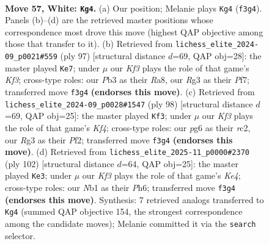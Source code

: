 \documentclass[11pt]{article}
\begin{document}
\clearpage

\begin{figure}[p]\centering
\begin{subfigure}{0.46\textwidth}\centering
\resizebox{\linewidth}{!}{%
\newchessgame
\chessboard[
  setfen={7k/5p1p/1n4p1/p3p1P1/P3P2P/1P3KR1/6P1/RN2rr2 w - - 1 57},
  showmover=false,
  pgfstyle=straightmove, color=movearrow, markmove={f3-g4}
]}
\caption{}
\end{subfigure}\hfill
\begin{subfigure}{0.46\textwidth}\centering
\resizebox{\linewidth}{!}{%
\newchessgame
\chessboard[
  setfen={r7/5pp1/r3pk1p/3p4/3P1P2/p3P3/R4K2/R7 b - - 0 49},
  showmover=false,
  pgfstyle=straightmove, color=movearrow, markmove={f6-e7}
]}
\caption{}
\end{subfigure}
\\[4pt]
\begin{subfigure}{0.46\textwidth}\centering
\resizebox{\linewidth}{!}{%
\newchessgame
\chessboard[
  setfen={4N3/1p1n1pR1/4p2k/1P2P2p/5K2/4R1PP/2r2P2/6r1 w - - 3 50},
  showmover=false,
  pgfstyle=straightmove, color=movearrow, markmove={f4-f3}
]}
\caption{}
\end{subfigure}\hfill
\begin{subfigure}{0.46\textwidth}\centering
\resizebox{\linewidth}{!}{%
\newchessgame
\chessboard[
  setfen={8/2p4r/1p2kr1P/p1p1p2R/P3K2R/1P1P4/2P5/8 w - - 17 52},
  showmover=false,
  pgfstyle=straightmove, color=movearrow, markmove={e4-e3}
]}
\caption{}
\end{subfigure}
\caption{\textbf{Move 57, White: \texttt{Kg4}.} (a) Our position; Melanie plays \texttt{Kg4} (\texttt{f3g4}). Panels (b)--(d) are the retrieved master positions whose correspondence most drove this move (highest QAP objective among those that transfer to it). (b) Retrieved from \texttt{lichess\_elite\_2024-09\_p0021\#559} (ply 97) [structural distance $d$=69, QAP obj=28]: the master played \texttt{Ke7}; under $\mu$ our \emph{Kf3} plays the role of that game's \emph{Kf3}; cross-type roles: our \emph{P}b3 as their \emph{R}a8, our \emph{R}g3 as their \emph{P}f7; transferred move \texttt{f3g4} \textbf{(endorses this move)}. (c) Retrieved from \texttt{lichess\_elite\_2024-09\_p0028\#1547} (ply 98) [structural distance $d$=69, QAP obj=25]: the master played \texttt{Kf3}; under $\mu$ our \emph{Kf3} plays the role of that game's \emph{Kf4}; cross-type roles: our \emph{p}g6 as their \emph{r}c2, our \emph{R}g3 as their \emph{P}f2; transferred move \texttt{f3g4} \textbf{(endorses this move)}. (d) Retrieved from \texttt{lichess\_elite\_2025-11\_p0000\#2370} (ply 102) [structural distance $d$=64, QAP obj=25]: the master played \texttt{Ke3}; under $\mu$ our \emph{Kf3} plays the role of that game's \emph{Ke4}; cross-type roles: our \emph{N}b1 as their \emph{P}h6; transferred move \texttt{f3g4} \textbf{(endorses this move)}. Synthesis: 7 retrieved analogs transferred to \texttt{Kg4} (summed QAP objective 154, the strongest correspondence among the candidate moves); Melanie committed it via the \texttt{search} selector.}
\label{fig:thought-m112}
\end{figure}
\end{document}
